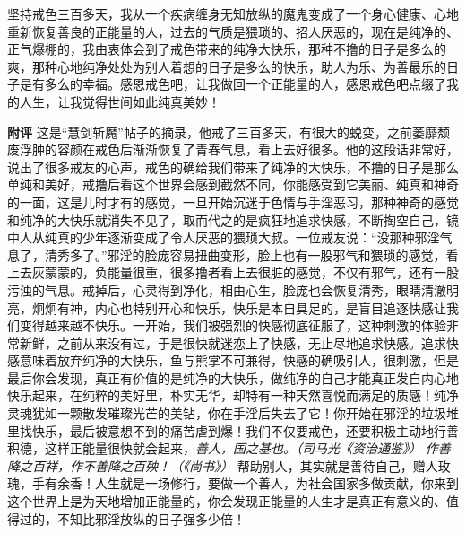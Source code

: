 \begin{case}
    坚持戒色三百多天，我从一个疾病缠身无知放纵的魔鬼变成了一个身心健康、心地重新恢复善良的正能量的人，过去的气质是猥琐的、招人厌恶的，现在是纯净的、正气爆棚的，我由衷体会到了戒色带来的纯净大快乐，那种不撸的日子是多么的爽，那种心地纯净处处为别人着想的日子是多么的快乐，助人为乐、为善最乐的日子是有多么的幸福。感恩戒色吧，让我做回一个正能量的人，感恩戒色吧点缀了我的人生，让我觉得世间如此纯真美妙！

    \textbf{附评} 这是“慧剑斩魔”帖子的摘录，他戒了三百多天，有很大的蜕变，之前萎靡颓废浮肿的容颜在戒色后渐渐恢复了青春气息，看上去好很多。他的这段话非常好，说出了很多戒友的心声，戒色的确给我们带来了纯净的大快乐，不撸的日子是那么单纯和美好，戒撸后看这个世界会感到截然不同，你能感受到它美丽、纯真和神奇的一面，这是儿时才有的感觉，一旦开始沉迷于色情与手淫恶习，那种神奇的感觉和纯净的大快乐就消失不见了，取而代之的是疯狂地追求快感，不断掏空自己，镜中人从纯真的少年逐渐变成了令人厌恶的猥琐大叔。一位戒友说：“没那种邪淫气息了，清秀多了。”邪淫的脸庞容易扭曲变形，脸上也有一股邪气和猥琐的感觉，看上去灰蒙蒙的，负能量很重，很多撸者看上去很脏的感觉，不仅有邪气，还有一股污浊的气息。戒掉后，心灵得到净化，相由心生，脸庞也会恢复清秀，眼睛清澈明亮，炯炯有神，内心也特别开心和快乐，快乐是本自具足的，是盲目追逐快感让我们变得越来越不快乐。一开始，我们被强烈的快感彻底征服了，这种刺激的体验非常新鲜，之前从来没有过，于是很快就迷恋上了快感，无止尽地追求快感。追求快感意味着放弃纯净的大快乐，鱼与熊掌不可兼得，快感的确吸引人，很刺激，但是最后你会发现，真正有价值的是纯净的大快乐，做纯净的自己才能真正发自内心地快乐起来，在纯粹的美好里，朴实无华，却特有一种天然喜悦而满足的质感！纯净灵魂犹如一颗散发璀璨光芒的美钻，你在手淫后失去了它！你开始在邪淫的垃圾堆里找快乐，最后被意想不到的痛苦虐到爆！我们不仅要戒色，还要积极主动地行善积德，这样正能量很快就会起来，\textit{善人，国之基也。（司马光《资治通鉴》）} \textit{作善降之百祥，作不善降之百殃！（《尚书》）} 帮助别人，其实就是善待自己，赠人玫瑰，手有余香！人生就是一场修行，要做一个善人，为社会国家多做贡献，你来到这个世界上是为天地增加正能量的，你会发现正能量的人生才是真正有意义的、值得过的，不知比邪淫放纵的日子强多少倍！
\end{case}

